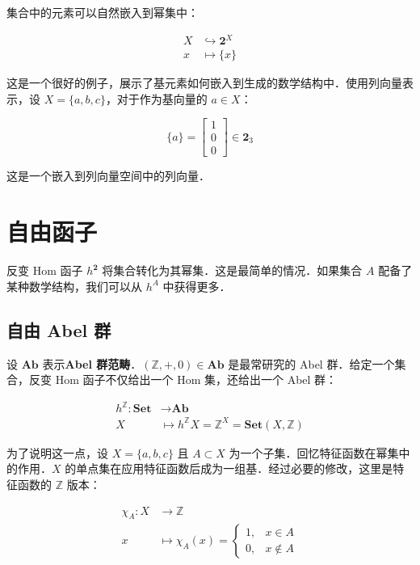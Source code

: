 \documentclass[10pt, openany]{book}
\begin{document}
集合中的元素可以自然嵌入到幂集中：

$$
\begin{aligned}
X &\hookrightarrow \mathbf{2}^X \\
x &\mapsto \{x\}
\end{aligned}
$$

这是一个很好的例子，展示了基元素如何嵌入到生成的数学结构中．使用列向量表示，设 $X = \{a,b,c\}$，对于作为基向量的 $a \in X$：

$$
\{a\} = \begin{bmatrix} 1 \\ 0 \\ 0 \end{bmatrix} \in \mathbf{2}_3
$$

这是一个嵌入到列向量空间中的列向量．

\chapter{自由函子}

反变 Hom 函子 $h^{\mathbf{2}}$ 将集合转化为其幂集．这是最简单的情况．如果集合 $A$ 配备了某种数学结构，我们可以从 $h^A$ 中获得更多．

\section{自由 Abel 群}

设 $\textbf{Ab}$ 表示\textbf{Abel 群范畴}．$(\mathbb Z,+,0) \in \textbf{Ab}$ 是最常研究的 Abel 群．给定一个集合，反变 Hom 函子不仅给出一个 Hom 集，还给出一个 Abel 群：

$$
\begin{aligned}
h^{\mathbb Z}: \textbf{Set} &\to \textbf{Ab} \\
X &\mapsto h^{\mathbb Z} X = \mathbb Z^X = \textbf{Set}(X,\mathbb Z)
\end{aligned}
$$

为了说明这一点，设 $X = \{a,b,c\}$ 且 $A \subset X$ 为一个子集．回忆特征函数在幂集中的作用．$X$ 的单点集在应用特征函数后成为一组基．经过必要的修改，这里是特征函数的 $\mathbb Z$ 版本：

$$
\begin{aligned}
\chi_A: X &\to \mathbb Z \\
x &\mapsto \chi_A(x) = \begin{cases} 1, & x \in A \\ 0, & x \notin A \end{cases}
\end{aligned}
$$
\end{document}
